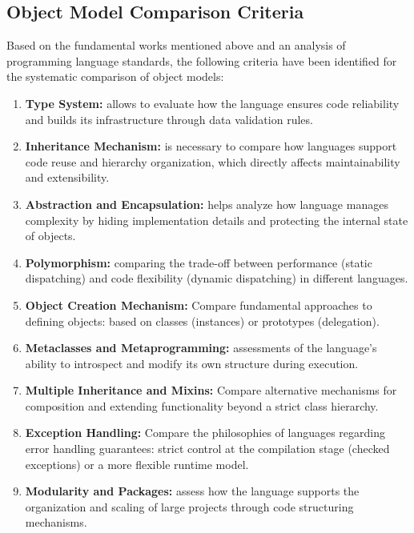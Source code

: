 \subsection{Object Model Comparison Criteria}

Based on the fundamental works mentioned above and an analysis of programming language standards, the following criteria have been identified for the systematic comparison of object models:

\begin{enumerate}
    \item \textbf{Type System:} allows to evaluate how the language ensures code reliability and builds its infrastructure through data validation rules.

    \item \textbf{Inheritance Mechanism:} is necessary to compare how languages support code reuse and hierarchy organization, which directly affects maintainability and extensibility.

    \item \textbf{Abstraction and Encapsulation:} helps analyze how language manages complexity by hiding implementation details and protecting the internal state of objects.

    \item \textbf{Polymorphism:} comparing the trade-off between performance (static dispatching) and code flexibility (dynamic dispatching) in different languages.

    \item \textbf{Object Creation Mechanism:} Compare fundamental approaches to defining objects: based on classes (instances) or prototypes (delegation).

    \item \textbf{Metaclasses and Metaprogramming:} assessments of the language's ability to introspect and modify its own structure during execution.

    \item \textbf{Multiple Inheritance and Mixins:} Compare alternative mechanisms for composition and extending functionality beyond a strict class hierarchy.

    \item \textbf{Exception Handling:} Compare the philosophies of languages regarding error handling guarantees: strict control at the compilation stage (checked exceptions) or a more flexible runtime model.

    \item \textbf{Modularity and Packages:} assess how the language supports the organization and scaling of large projects through code structuring mechanisms.


\end{enumerate}
